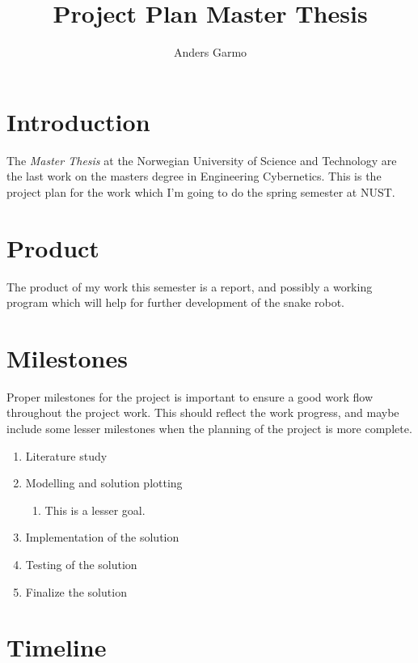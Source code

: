 \documentclass[a4paper, 10pt]{article}
\title{Project Plan Master Thesis}
\author{Anders Garmo}
\begin{document}
\maketitle


\section{Introduction}
The \emph{Master Thesis} at the Norwegian University of Science and Technology are the
last work on the masters degree in Engineering Cybernetics. This is the project plan for
the work which I'm going to do the spring semester at NUST. 

\section{Product}
The product of my work this semester is a report, and possibly a working program which
will help for further development of the snake robot. 


\section{Milestones}
Proper milestones for the project is important to ensure a good work flow throughout the
project work. This should reflect the work progress, and maybe include some lesser
milestones when the planning of the project is more complete.

\begin{enumerate}
    \item Literature study
    \item Modelling and solution plotting
        \begin{enumerate}
            \item This is a lesser goal.
        \end{enumerate}
    \item Implementation of the solution
    \item Testing of the solution
    \item Finalize the solution
\end{enumerate}



\section{Timeline}
\end{document}
